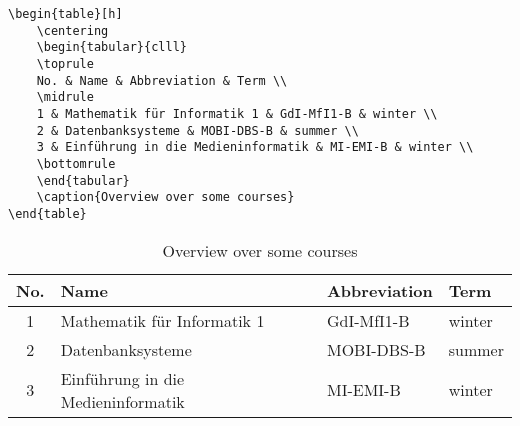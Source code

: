 \begin{verbatim}
\begin{table}[h]
	\centering
	\begin{tabular}{clll}
	\toprule
	No. & Name & Abbreviation & Term \\
	\midrule
	1 & Mathematik für Informatik 1 & GdI-MfI1-B & winter \\
	2 & Datenbanksysteme & MOBI-DBS-B & summer \\
	3 & Einführung in die Medieninformatik & MI-EMI-B & winter \\		
	\bottomrule
	\end{tabular}
	\caption{Overview over some courses}
\end{table}
\end{verbatim}

\begin{table}[h]
	\centering
	\begin{tabular}{clll}
	\toprule
	No. & Name & Abbreviation & Term \\
	\midrule
	1 & Mathematik für Informatik 1 & GdI-MfI1-B & winter \\
	2 & Datenbanksysteme & MOBI-DBS-B & summer \\
	3 & Einführung in die Medieninformatik & MI-EMI-B & winter \\		
	\bottomrule
	\end{tabular}
	\caption{Overview over some courses}
\end{table}
